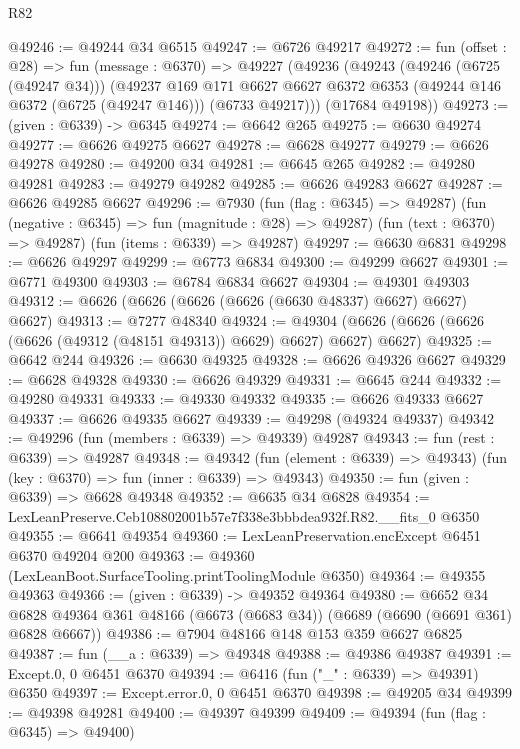 \begin{lexlean}{R82}
\begin{coremodule}
@49246 := @49244 @34 @6515
@49247 := @6726 @49217
@49272 := fun (offset : @28) =>
  fun (message : @6370) =>
  @49227
    (@49236
      (@49243
        (@49246 (@6725 (@49247 @34)))
        (@49237
          @169
          @171
          @6627
          @6627
          @6372
          @6353
          (@49244 @146 @6372 (@6725 (@49247 @146)))
          (@6733 @49217)))
      (@17684 @49198))
@49273 := (given : @6339) -> @6345
@49274 := @6642 @265
@49275 := @6630 @49274
@49277 := @6626 @49275 @6627
@49278 := @6628 @49277
@49279 := @6626 @49278
@49280 := @49200 @34
@49281 := @6645 @265
@49282 := @49280 @49281
@49283 := @49279 @49282
@49285 := @6626 @49283 @6627
@49287 := @6626 @49285 @6627
@49296 := @7930
    (fun (flag : @6345) => @49287)
    (fun (negative : @6345) => fun (magnitude : @28) => @49287)
    (fun (text : @6370) => @49287)
    (fun (items : @6339) => @49287)
@49297 := @6630 @6831
@49298 := @6626 @49297
@49299 := @6773 @6834
@49300 := @49299 @6627
@49301 := @6771 @49300
@49303 := @6784 @6834 @6627
@49304 := @49301 @49303
@49312 := @6626 (@6626 (@6626 (@6626 (@6630 @48337) @6627) @6627) @6627)
@49313 := @7277 @48340
@49324 := @49304 (@6626 (@6626 (@6626 (@6626 (@49312 (@48151 @49313)) @6629) @6627) @6627) @6627)
@49325 := @6642 @244
@49326 := @6630 @49325
@49328 := @6626 @49326 @6627
@49329 := @6628 @49328
@49330 := @6626 @49329
@49331 := @6645 @244
@49332 := @49280 @49331
@49333 := @49330 @49332
@49335 := @6626 @49333 @6627
@49337 := @6626 @49335 @6627
@49339 := @49298 (@49324 @49337)
@49342 := @49296 (fun (members : @6339) => @49339) @49287
@49343 := fun (rest : @6339) => @49287
@49348 := @49342
    (fun (element : @6339) => @49343)
    (fun (key : @6370) => fun (inner : @6339) => @49343)
@49350 := fun (given : @6339) => @6628 @49348
@49352 := @6635 @34 @6828
@49354 := LexLeanPreserve.Ceb108802001b57e7f338e3bbbdea932f.R82.__fits_0 @6350
@49355 := @6641 @49354
@49360 := LexLeanPreservation.encExcept @6451 @6370 @49204 @200
@49363 := @49360 (LexLeanBoot.SurfaceTooling.printToolingModule @6350)
@49364 := @49355 @49363
@49366 := (given : @6339) -> @49352 @49364
@49380 := @6652
    @34
    @6828
    @49364
    @361
    @48166
    (@6673 (@6683 @34))
    (@6689 (@6690 (@6691 @361) @6828 @6667))
@49386 := @7904 @48166 @148 @153 @359 @6627 @6825
@49387 := fun (__a : @6339) => @49348
@49388 := @49386 @49387
@49391 := Except.{0, 0} @6451 @6370
@49394 := @6416 (fun ("_" : @6339) => @49391) @6350
@49397 := Except.error.{0, 0} @6451 @6370
@49398 := @49205 @34
@49399 := @49398 @49281
@49400 := @49397 @49399
@49409 := @49394
    (fun (flag : @6345) => @49400)

\end{coremodule}
\end{lexlean}
